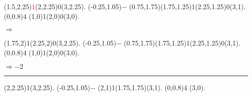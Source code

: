 \documentclass[11pt,a4paper]{article}
\begin{document}
\begin{center}
\begin{table}[ht!]
\begin{minipage}{0.1\textwidth}
  \end{minipage}
  \hfillx
  \begin{minipage}{0.15\textwidth}

\par\vspace{3\oplineheight}
\oplput(1.5,2.25){\scriptsize \textcolor{red}{1}}\oplput(2,2.25){0}\oplput(3,2.25){.}
\oplput(-0.25,1.05){$-$}
\oplput(0.75,1.75){\tiny \textcolor{red}{}}\oplput(1.75,1.25){\scriptsize 1}\oplput(2.25,1.25){\scriptsize 0}\oplput(3,1){.}
\ophline(0,0.8){4}
\oplput(1,0){\textcolor{gray(x11gray)}{1}}\oplput(2,0){0}\oplput(3,0){.}

  \end{minipage}
  \hfillx
  \begin{minipage}{0.1\textwidth}

\phantom{ } $ \Rightarrow $

  \end{minipage}
  \hfillx
  \begin{minipage}{0.15\textwidth}

\par\vspace{3\oplineheight}
\oplput(1.75,2){\scriptsize 1}\oplput(2.25,2){\scriptsize 0}\oplput(3,2.25){.}
\oplput(-0.25,1.05){$-$}
\oplput(0.75,1.75){\tiny \textcolor{red}{}}\oplput(1.75,1.25){\scriptsize 1}\oplput(2.25,1.25){\scriptsize 0}\oplput(3,1){.}
\ophline(0,0.8){4}
\oplput(1,0){\textcolor{gray(x11gray)}{1}}\oplput(2,0){0}\oplput(3,0){.}

  \end{minipage}
  \hfillx
  \begin{minipage}{0.1\textwidth}

\textcolor{gray(x11gray)}{$ \mathit{\Rightarrow -2} $}

  \end{minipage}
\end{table}


\rule{1.0\linewidth}{0.75pt}

\begin{table}[ht!]
  \centering
  \begin{minipage}{0.15\textwidth}

\par\vspace{3\oplineheight}
\oplput(2,2.25){1}\oplput(3,2.25){.}
\oplput(-0.25,1.05){$-$}
\oplput(2,1){1}\oplput(1.75,1.75){\tiny \textcolor{blue}{}}\oplput(3,1){.}
\ophline(0,0.8){4}
\oplput(3,0){.}


\end{minipage}
\end{table}
\end{center}
\end{document}
